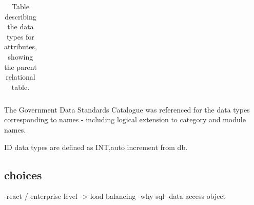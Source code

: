 \begin{table}[H]
\begin{tabular}{| c | c | c | c |}
 \hline
\end{tabular}
\caption{Table describing the data types for attributes, showing the parent relational table.}
\label{table:atypetable}
\end{table}

The Government Data Standards Catalogue\cite{dataStandards} was referenced for the data types corresponding to names - including logical extension to category and module names. 

ID data types are defined as INT,auto increment from db. 

\subsection{choices}

-react / enterprise level -> load balancing
-why sql
-data access object